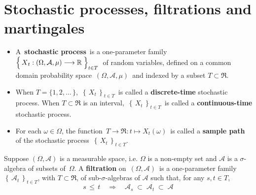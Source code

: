 

\section{Stochastic processes, filtrations and martingales}
\setcounter{theorem}{0}
\setcounter{equation}{0}


\renewcommand{\theenumi}{\roman{enumi}}
\renewcommand{\labelenumi}{\textnormal{(\theenumi)}$\;\;$}


\begin{definition}
\mbox{}
\vskip -0.2cm
\noindent
\begin{itemize}
\item
	A \,\textbf{stochastic process}\, is a one-parameter family
	\,$\left\{\,\overset{{\color{white}.}}{X}_{t} : (\Omega,\mathcal{A},\mu) \longrightarrow \Re \;\right\}_{t \in T}$\,
	of random variables, defined on a common domain probability space
	\,$(\Omega,\mathcal{A},\mu)$\, and indexed by a subset $T \subset \Re$.
\item
	When $T = \{1,2,\ldots\,\}$,
	\,$\left\{\,X_{t}\,\right\}_{t \in T}$\,
	is called a \textbf{discrete-time} stochastic process.
	When $T \subset \Re$ is an interval,
	\,$\left\{\,X_{t}\,\right\}_{t \in T}$\,
	is called a \textbf{continuous-time} stochastic process.
\item
	For each $\omega \in \Omega$, the function
	\,$T \longrightarrow \Re : t \longmapsto X_{t}(\omega)$\,
	is called a \textbf{sample path} of the stochastic process
	\,$\left\{\,X_{t}\,\right\}_{t \in T}$.	
\end{itemize}
\end{definition}


\begin{definition}[Filtration]
\mbox{}
\vskip 0.2cm
\noindent
Suppose $(\Omega,\mathcal{A})$ is a measurable space,
i.e. $\Omega$ is a non-empty set and $\mathcal{A}$ is a $\sigma$-algebra
of subsets of \,$\Omega$.
A \textbf{filtration} on \,$(\Omega,\mathcal{A})$\,
is a one-parameter family
$\left\{\,\mathcal{A}_{t}\,\right\}_{t \in T}$, with $T \subset \Re$,
of sub-$\sigma$-algebras of $\mathcal{A}$
such that, for any $s, t \in T$,
\begin{equation*}
s \,\leq\, t
\quad\Longrightarrow\quad
\mathcal{A}_{s} \; \subset \; \mathcal{A}_{t} \; \subset \; \mathcal{A}
\end{equation*}
\end{definition}

